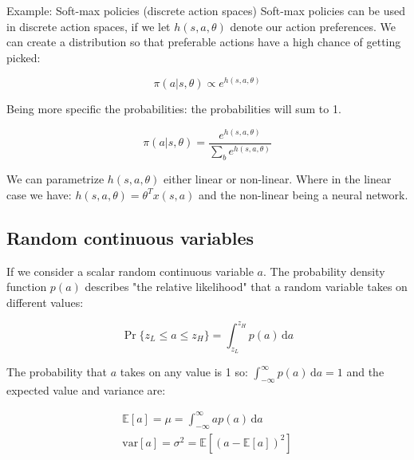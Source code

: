 \begin{example}{Example: Soft-max policies (discrete action spaces)}
Soft-max policies can be used in discrete action spaces, if we let $h(s,a,\theta)$ denote our action preferences. We can create a distribution so that preferable actions have a high chance of getting picked:

	\begin{equation*}
		\pi (a|s,\theta) \propto e^{h(s,a,\theta)}
	\end{equation*}

Being more specific the probabilities: the probabilities will sum to 1. 

	\begin{equation}
		\pi (a|s,\theta) = \frac{e^{h(s,a,\theta)}} {\sum_{b}^{}e^{h(s,a,\theta)}} 
	\end{equation}

We can parametrize $h(s,a,\theta)$ either linear or non-linear. Where in the linear case we have: $h(s,a,\theta) = \theta^{T}x(s,a)$ and the non-linear being a neural network. 

\end{example}	

\subsection*{Random continuous variables}
If we consider a scalar random continuous variable $a$. The probability density function $p(a)$ describes "the relative likelihood" that a random variable takes on different values:

	\begin{equation}
		\Pr \{ z_L \le a \le z_H\} = \int_{z_L}^{z_H} p(a)\,\text{d}a
	\end{equation}

The probability that $a$ takes on any value is 1 so: $\int_{-\infty}^{\infty} p(a)\,\text{d}a = 1$ and the expected value and variance are:

	\begin{equation}
	\begin{aligned}
		\mathbb{E} [a] = \mu = \int_{-\infty}^{\infty} ap(a)\,\text{d}a \\
		\text{var} [a] = \sigma^{2} = \mathbb{E}[(a-\mathbb{E}[a])^{2}]
	\end{aligned}
	\end{equation}


